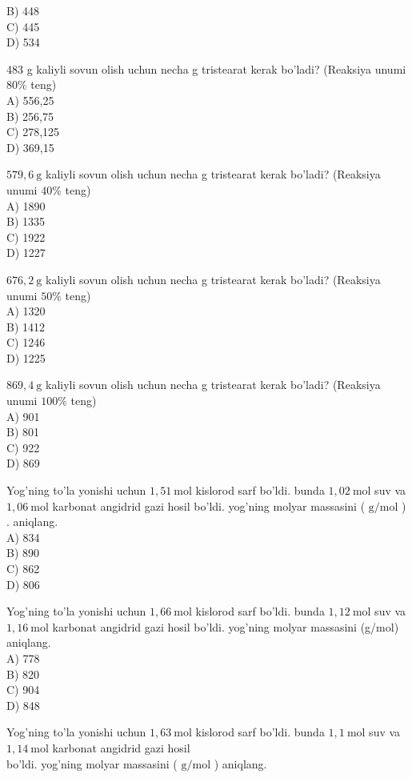 B) 448\\
C) 445\\
D) 534
  \item 483 g kaliyli sovun olish uchun necha g tristearat kerak bo'ladi? (Reaksiya unumi $80 \%$ teng)\\
A) 556,25\\
B) 256,75\\
C) 278,125\\
D) 369,15
  \item $579,6 \mathrm{~g}$ kaliyli sovun olish uchun necha g tristearat kerak bo'ladi? (Reaksiya unumi $40 \%$ teng)\\
A) 1890\\
B) 1335\\
C) 1922\\
D) 1227
  \item $676,2 \mathrm{~g}$ kaliyli sovun olish uchun necha g tristearat kerak bo'ladi? (Reaksiya unumi $50 \%$ teng)\\
A) 1320\\
B) 1412\\
C) 1246\\
D) 1225
  \item $869,4 \mathrm{~g}$ kaliyli sovun olish uchun necha g tristearat kerak bo'ladi? (Reaksiya unumi $100 \%$ teng)\\
A) 901\\
B) 801\\
C) 922\\
D) 869
  \item Yog'ning to'la yonishi uchun $1,51 \mathrm{~mol}$ kislorod sarf bo'ldi. bunda $1,02 \mathrm{~mol}$ suv va $1,06 \mathrm{~mol}$ karbonat angidrid gazi hosil bo'ldi. yog'ning molyar massasini ( $\mathrm{g} / \mathrm{mol}$ ) . aniqlang.\\
A) 834\\
B) 890\\
C) 862\\
D) 806
  \item Yog'ning to'la yonishi uchun $1,66 \mathrm{~mol}$ kislorod sarf bo'ldi. bunda $1,12 \mathrm{~mol}$ suv va $1,16 \mathrm{~mol}$ karbonat angidrid gazi hosil bo'ldi. yog'ning molyar massasini (g/mol) aniqlang.\\
A) 778\\
B) 820\\
C) 904\\
D) 848
  \item Yog'ning to'la yonishi uchun $1,63 \mathrm{~mol}$ kislorod sarf bo'ldi. bunda $1,1 \mathrm{~mol}$ suv va $1,14 \mathrm{~mol}$ karbonat angidrid gazi hosil\\bo'ldi. yog'ning molyar massasini ( $\mathrm{g} / \mathrm{mol}$ ) aniqlang.\\
